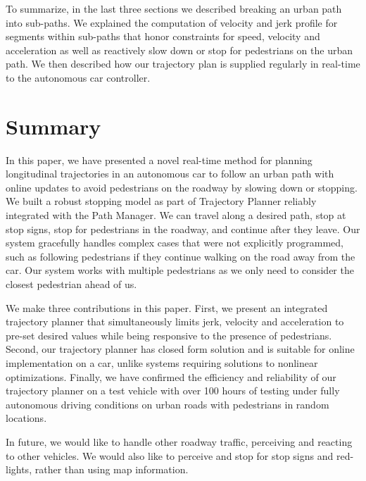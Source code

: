 \documentclass[letterpaper, 10 pt, conference]{ieeeconf}  %
\begin{document}

To summarize, in the last three sections we described breaking an urban path into sub-paths. We 
explained the computation of velocity and jerk profile for segments within sub-paths that honor constraints
for speed, velocity and acceleration as well as reactively slow down or stop for pedestrians on
the urban path. We then described how our trajectory plan is supplied regularly in real-time to the
autonomous car controller.

\section{Summary} \label{sec:summary}


In this paper, we have presented a novel real-time method for planning longitudinal trajectories 
in an autonomous car to follow an urban path with online updates to avoid pedestrians on the roadway by slowing down or 
stopping.
We built a robust stopping model as part of Trajectory Planner reliably integrated with the Path Manager.
We can travel along a desired path, stop at stop signs, stop for pedestrians in the roadway, and continue after 
they leave. Our system gracefully handles complex cases that were not explicitly programmed, such as following 
pedestrians if they continue walking on the road away from the car. Our system works with multiple 
pedestrians as we only need to consider the closest pedestrian ahead of us. 

We make three contributions in this paper. First, we present an integrated trajectory planner that
simultaneously limits jerk, velocity and acceleration to pre-set desired values while being responsive 
to the presence of pedestrians.
Second, our trajectory planner has closed form solution and is suitable for online implementation
on a car, unlike systems requiring solutions to nonlinear optimizations. Finally, we have confirmed the
efficiency and reliability of our trajectory planner on a test vehicle with over 100 hours of testing
under fully autonomous driving conditions on urban roads with pedestrians in random locations. 

In future, we would like to handle other roadway traffic, perceiving and reacting to other vehicles. We would also like to perceive and stop for stop signs and red-lights,
rather than using map information.





\end{document}
